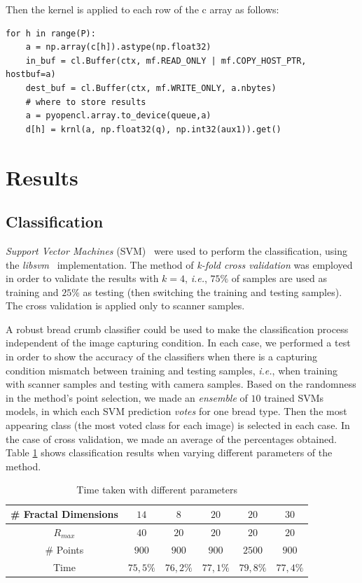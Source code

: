 \documentclass[oneside,a4paper,english,links]{article}
\begin{document}
Then the kernel is applied to each row of the c array as follows:

\begin{verbatim}
for h in range(P):        
    a = np.array(c[h]).astype(np.float32)
    in_buf = cl.Buffer(ctx, mf.READ_ONLY | mf.COPY_HOST_PTR, hostbuf=a)
    dest_buf = cl.Buffer(ctx, mf.WRITE_ONLY, a.nbytes)
    # where to store results      
    a = pyopencl.array.to_device(queue,a)
    d[h] = krnl(a, np.float32(q), np.int32(aux1)).get()  
\end{verbatim}
\section{Results}

\subsection{Classification}
{\em Support Vector Machines} (SVM)~\cite{Boser92} were used to perform the classification, using the {\em libsvm}~\cite{Chang2011} implementation. The method of {\em k-fold cross validation} was employed in order to validate the results with $k = 4$, {\em i.e.}, $75\%$ of samples are used as training and $25\%$ as testing (then switching the training and testing samples). The cross validation is applied only to scanner samples.

A robust bread crumb classifier could be used to make the classification process independent of the image capturing condition. In each case, we performed a test in order to show the accuracy of the classifiers when there is a capturing condition mismatch between training and testing samples, {\em i.e.}, when training with scanner samples and testing with camera samples. Based on the randomness in the method's point selection, we made an {\em ensemble} of $10$ trained SVMs models, in which each SVM prediction {\em votes} for one bread type. Then the most appearing class (the most voted class for each image) is selected in each case. In the case of cross validation, we made an average of the percentages obtained. Table \ref{table:tableFirstTest} shows classification results when varying different parameters of the method.

\begin{table}[htb]
\centering
\begin{tabular}{|c|c|c|c|c|c|}
    \hline
    \# Fractal Dimensions & $14$ & $8$ & $20$ & $20$ & $30$\\
    \hline
    $R_{max}$ & $40$ & $20$ & $20$ & $20$ & $20$\\
    \hline
    \# Points & $900$ & $900$ & $900$ & $2500$ & $900$\\
    \hline
    Time  & $75,5\%$ & $76,2\%$ & $77,1\%$ & $79,8\%$ & $77,4\%$\\
    \hline
\end{tabular}
\caption{Time taken with different parameters}
\label{table:tableFirstTest}
\end{table}
\end{document}
